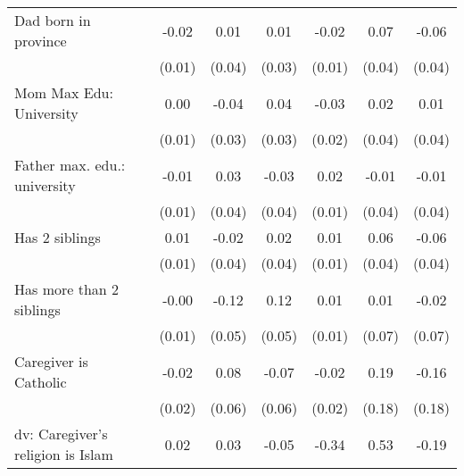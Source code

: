 {\begin{tabular}{l*{6}{c}}
\addlinespace
Dad born in province&       -0.02         &        0.01         &        0.01         &       -0.02         &        0.07\sym{*}  &       -0.06         \\
                    &      (0.01)         &      (0.04)         &      (0.03)         &      (0.01)         &      (0.04)         &      (0.04)         \\
\addlinespace
Mom Max Edu: University&        0.00         &       -0.04         &        0.04         &       -0.03         &        0.02         &        0.01         \\
                    &      (0.01)         &      (0.03)         &      (0.03)         &      (0.02)         &      (0.04)         &      (0.04)         \\
\addlinespace
Father max. edu.: university&       -0.01         &        0.03         &       -0.03         &        0.02         &       -0.01         &       -0.01         \\
                    &      (0.01)         &      (0.04)         &      (0.04)         &      (0.01)         &      (0.04)         &      (0.04)         \\
\addlinespace
Has 2 siblings      &        0.01         &       -0.02         &        0.02         &        0.01         &        0.06         &       -0.06         \\
                    &      (0.01)         &      (0.04)         &      (0.04)         &      (0.01)         &      (0.04)         &      (0.04)         \\
\addlinespace
Has more than 2 siblings&       -0.00         &       -0.12\sym{*}  &        0.12\sym{*}  &        0.01         &        0.01         &       -0.02         \\
                    &      (0.01)         &      (0.05)         &      (0.05)         &      (0.01)         &      (0.07)         &      (0.07)         \\
\addlinespace
Caregiver is Catholic&       -0.02         &        0.08         &       -0.07         &       -0.02         &        0.19         &       -0.16         \\
                    &      (0.02)         &      (0.06)         &      (0.06)         &      (0.02)         &      (0.18)         &      (0.18)         \\
\addlinespace
dv: Caregiver's religion is Islam&        0.02         &        0.03         &       -0.05         &       -0.34         &        0.53         &       -0.19         \\

\end{tabular}}
